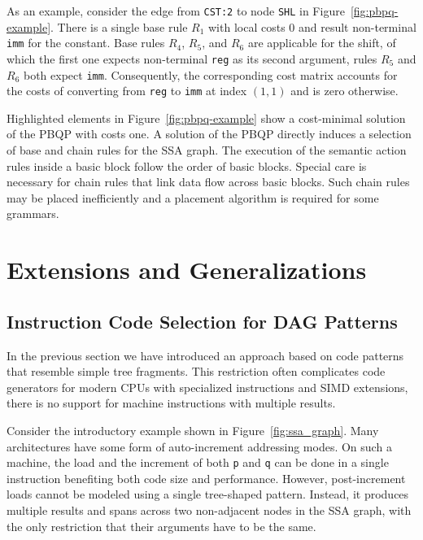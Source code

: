 As an example, consider the edge from \texttt{CST:2} to node
\texttt{SHL} in Figure~\ref{fig:pbpq-example}. There is a single base
rule $R_1$ with local costs 0 and result non-terminal \texttt{imm} for
the constant. Base rules $R_4$, $R_5$, and $R_6$ are applicable for
the shift, of which the first one expects non-terminal \texttt{reg} as
its second argument, rules $R_5$ and $R_6$ both expect
\texttt{imm}. Consequently, the corresponding cost matrix accounts for
the costs of converting from \texttt{reg} to \texttt{imm} at index
$(1,1)$ and is zero otherwise.

Highlighted elements in Figure~\ref{fig:pbpq-example} show a
cost-minimal solution of the PBQP with costs one. A solution of the
PBQP directly induces a selection of base and chain rules for the SSA
graph. The execution of the semantic action rules inside a basic block
follow the order of basic blocks. Special care is necessary for chain rules 
that link data flow across basic blocks. Such chain rules may be placed
inefficiently and a placement algorithm is required for
some grammars. 

\section{Extensions and Generalizations}

\subsection{Instruction Code Selection for DAG Patterns}
\label{sec:dag_patterns}
In the previous section we have introduced an approach based on code
patterns that resemble simple tree fragments. This restriction often
complicates code generators for modern CPUs with specialized
instructions and SIMD extensions, \eg there is no support for
machine instructions with multiple results.

Consider the introductory example shown
in Figure~\ref{fig:ssa_graph}. Many architectures have some form of
auto-increment addressing modes. On such a machine, the load and the
increment of both \texttt{p} and \texttt{q} can be done in a single
instruction benefiting both code size and performance. However,
post-increment loads cannot be modeled using a single tree-shaped
pattern. Instead, it produces multiple results and spans across two
non-adjacent nodes in the SSA graph, with the only restriction that
their arguments have to be the same.


